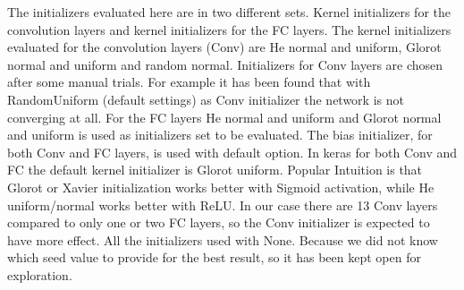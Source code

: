 The initializers evaluated here are in two different sets. Kernel initializers for the convolution layers and kernel initializers for the FC layers. The kernel initializers evaluated for the convolution layers (Conv) are He normal
and uniform, Glorot normal and uniform and random normal. Initializers for Conv layers are chosen after some manual trials. For example it has been found that with RandomUniform (default settings) as Conv initializer the 
network is not converging at all. For the FC layers He normal and uniform and Glorot normal and uniform is used as initializers set to be evaluated. The bias initializer, for both Conv and FC layers, is used with default  option.
In keras for both Conv and FC the default kernel initializer is Glorot uniform. Popular Intuition is that Glorot or Xavier initialization works better with Sigmoid activation, while He uniform/normal works better with ReLU.%
In our case there are 13 Conv layers compared to only one or two FC layers, so the Conv initializer is expected to have more effect.
All the initializers used with  None. Because we did not know which seed value to provide for the best result, so it has been kept open for exploration.

